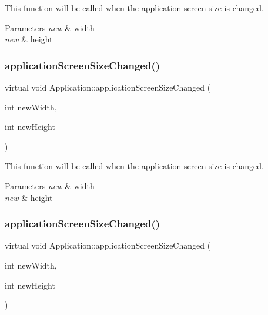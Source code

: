 This function will be called when the application screen size is changed. 


\begin{DoxyParams}{Parameters}
{\em new} & width \\
\hline
{\em new} & height \\
\hline
\end{DoxyParams}
\mbox{\label{classApplication_a099008d482b87b47440b11ecb536d5e3}} 
\subsubsection{\texorpdfstring{application\+Screen\+Size\+Changed()}{applicationScreenSizeChanged()}\hspace{0.1cm}{\footnotesize\ttfamily [3/4]}}
{\footnotesize\ttfamily virtual void Application\+::application\+Screen\+Size\+Changed (\begin{DoxyParamCaption}\item[{int}]{new\+Width,  }\item[{int}]{new\+Height }\end{DoxyParamCaption})\hspace{0.3cm}{\ttfamily [virtual]}}



This function will be called when the application screen size is changed. 


\begin{DoxyParams}{Parameters}
{\em new} & width \\
\hline
{\em new} & height \\
\hline
\end{DoxyParams}
\mbox{\label{classApplication_a099008d482b87b47440b11ecb536d5e3}} 
\subsubsection{\texorpdfstring{application\+Screen\+Size\+Changed()}{applicationScreenSizeChanged()}\hspace{0.1cm}{\footnotesize\ttfamily [4/4]}}
{\footnotesize\ttfamily virtual void Application\+::application\+Screen\+Size\+Changed (\begin{DoxyParamCaption}\item[{int}]{new\+Width,  }\item[{int}]{new\+Height }\end{DoxyParamCaption})\hspace{0.3cm}{\ttfamily [virtual]}}




